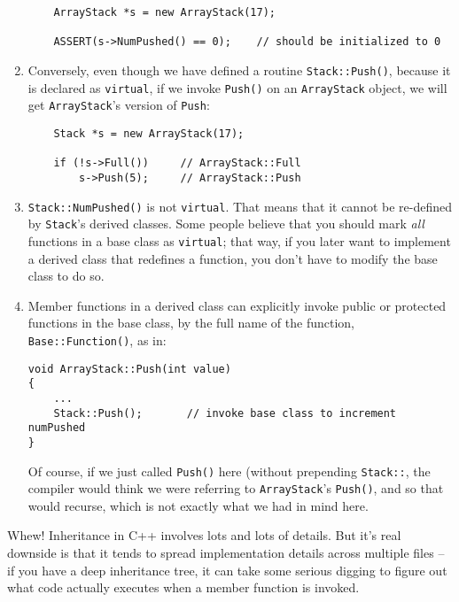 \begin{enumerate}
\begin{verbatim}
    ArrayStack *s = new ArrayStack(17);

    ASSERT(s->NumPushed() == 0);	// should be initialized to 0
\end{verbatim}

\item Conversely, even though we have defined a routine {\tt Stack::Push()},
because it is declared as {\tt virtual}, if we invoke {\tt Push()} 
on an {\tt ArrayStack} object, we will get {\tt ArrayStack}'s version 
of {\tt Push}:

\begin{verbatim}
    Stack *s = new ArrayStack(17);

    if (!s->Full())		// ArrayStack::Full
        s->Push(5);		// ArrayStack::Push
\end{verbatim}

\item {\tt Stack::NumPushed()} is not {\tt virtual}.  That means 
that it cannot be re-defined by {\tt Stack}'s derived classes.
Some people believe that you should mark {\em all} functions
in a base class as {\tt virtual}; that way, if you later want to
implement a derived class that redefines a function, you don't have
to modify the base class to do so.

\item Member functions in a derived class can explicitly invoke 
public or protected functions in the base class, by the full
name of the function, {\tt Base::Function()}, as in:

\begin{verbatim}
void ArrayStack::Push(int value)
{
    ...
    Stack::Push();	     // invoke base class to increment numPushed
}
\end{verbatim}

Of course, if we just called {\tt Push()} here (without prepending 
{\tt Stack::}, the compiler would think we were referring 
to {\tt ArrayStack}'s {\tt Push()}, and so that would recurse,
which is not exactly what we had in mind here.

\end{enumerate}

Whew!  Inheritance in C++ involves lots and lots of details.
But it's real downside is that it tends to spread implementation 
details across multiple files -- if you have a deep inheritance 
tree, it can take some serious digging to figure out what code 
actually executes when a member function is invoked.

